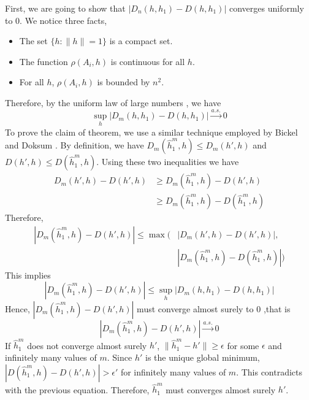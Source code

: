 \documentclass[10pt,journal,compsoc]{IEEEtran}
\newenvironment{proof}[1][Proof]{\begin{trivlist}
		\item[\hskip \labelsep {\bfseries #1}]}{\end{trivlist}}
\begin{document}
\appendix
\begin{proof} [Proof of Theorem 4.1]
First,  we are going to show that $|D_n(h,h_1)-D(h,h_1)|$ converges uniformly to $0$.
We notice three facts,
\begin{itemize}
	\item[(1)] The set $\{h: \|h\|=1\}$ is a compact set.
	\item[(2)] The function $\rho(A_i,h)$ is continuous for all $h$.
	\item[(3)] For all $h$, $\rho(A_i,h)$ is bounded by $n^2$.
\end{itemize}
Therefore, by the uniform law of large numbers \cite{jennrich1969asymptotic}, we have
\[\underset{h}{\sup}|D_m(h,h_1)-D(h,h_1)|\overset{a.s.}{\rightarrow} 0\]
To prove the claim of theorem, we use a similar technique employed by Bickel and Doksum \cite{bickel2015mathematical}. By definition, we have $D_m(\hat{h}_1^m,h)  \leq D_m(h',h)$ and $D(h',h) \leq D(\hat{h}_1^m,h)$. Using these two inequalities we have
\begin{align*}
D_m(h',h)-D(h',h) &\geq D_m(\hat{h}_1^m,h)-D(h',h) \\
&\geq D_m(\hat{h}_1^m,h)-D(\hat{h}_1^m,h) 
\end{align*}
Therefore, 
\begin{align*}
|D_m(\hat{h}_1^m,h)-D(h',h)|  \leq  \max(&|D_m(h',h)-D(h',h)|,\\
& |D_m(\hat{h}_1^m,h)-D(\hat{h}_1^m,h)|)
\end{align*}
This implies 
\[ |D_m(\hat{h}_1^m,h)-D(h',h)| \leq \underset{h}{\sup}|D_m(h,h_1)-D(h,h_1)| \]
Hence, $|D_m(\hat{h}_1^m,h)-D(h',h)|$ must converge almost surely to $0$ ,that is
\[|D_m(\hat{h}_1^m,h)-D(h',h)|\overset{a.s.}{\rightarrow} 0 \]
 If $\hat{h}_1^m$ does not converge almost surely $h'$, $\|\hat{h}_1^m-h'\|\geq \epsilon$ for some $\epsilon$ and infinitely many values of $m$. Since $h'$ is the unique global minimum, $|D(\hat{h}_1^m,h)-D(h',h)| > \epsilon' $ for infinitely many values of $m$. This contradicts with the previous equation. Therefore, $\hat{h}_1^m$ must converges almost surely $h'$.
	
\end{proof}
\end{document}

